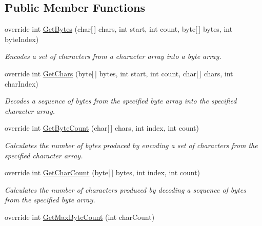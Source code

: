 \subsection*{Public Member Functions}
\begin{DoxyCompactItemize}
\item 
override int \mbox{\hyperlink{class_super_tiled2_unity_1_1_ionic_1_1_encoding_1_1_iso8859_dash1_encoding_a2e48c5710727c048a0755c1bbf1ceeb3}{Get\+Bytes}} (char\mbox{[}$\,$\mbox{]} chars, int start, int count, byte\mbox{[}$\,$\mbox{]} bytes, int byte\+Index)
\begin{DoxyCompactList}\small\item\em Encodes a set of characters from a character array into a byte array. \end{DoxyCompactList}\item 
override int \mbox{\hyperlink{class_super_tiled2_unity_1_1_ionic_1_1_encoding_1_1_iso8859_dash1_encoding_a053cb2825528f45d36e5c2cdb4d32052}{Get\+Chars}} (byte\mbox{[}$\,$\mbox{]} bytes, int start, int count, char\mbox{[}$\,$\mbox{]} chars, int char\+Index)
\begin{DoxyCompactList}\small\item\em Decodes a sequence of bytes from the specified byte array into the specified character array. \end{DoxyCompactList}\item 
override int \mbox{\hyperlink{class_super_tiled2_unity_1_1_ionic_1_1_encoding_1_1_iso8859_dash1_encoding_a8113d10dde7122b7b6372adc37747e02}{Get\+Byte\+Count}} (char\mbox{[}$\,$\mbox{]} chars, int index, int count)
\begin{DoxyCompactList}\small\item\em Calculates the number of bytes produced by encoding a set of characters from the specified character array. \end{DoxyCompactList}\item 
override int \mbox{\hyperlink{class_super_tiled2_unity_1_1_ionic_1_1_encoding_1_1_iso8859_dash1_encoding_a8eed4e507b1b8864b03a3abaf9453f14}{Get\+Char\+Count}} (byte\mbox{[}$\,$\mbox{]} bytes, int index, int count)
\begin{DoxyCompactList}\small\item\em Calculates the number of characters produced by decoding a sequence of bytes from the specified byte array. \end{DoxyCompactList}\item 
override int \mbox{\hyperlink{class_super_tiled2_unity_1_1_ionic_1_1_encoding_1_1_iso8859_dash1_encoding_af8c5d732dfb39008a9d8d418df2b89a9}{Get\+Max\+Byte\+Count}} (int char\+Count)

\end{DoxyCompactItemize}
